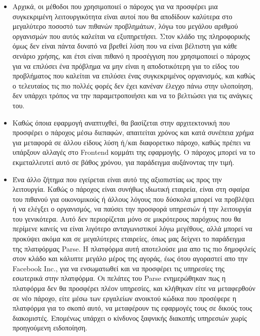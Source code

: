 \documentclass{article}
\begin{document}
\begin{itemize}
\item Αρχικά, οι μέθοδοι που χρησιμοποιεί ο πάροχος για να προσφέρει μια συγκεκριμένη λειτουργικότητα είναι αυτοί που θα αποδίδουν καλύτερα στο μεγαλύτερο ποσοστό των πιθανών προβλημάτων, λόγω του μεγάλου αριθμού οργανισμών που αυτός καλείται να εξυπηρετήσει. Στον κλάδο της πληροφορικής όμως δεν είναι πάντα δυνατό να βρεθεί λύση που να είναι βέλτιστη για κάθε σενάριο χρήσης, και έτσι είναι πιθανό η προσέγγιση που χρησιμοποιεί ο πάροχος για να επιλύσει ένα πρόβλημα να μην είναι η αποδοτικότερη για το είδος του προβλήματος που καλείται να επιλύσει ένας συγκεκριμένος οργανισμός, και καθώς ο τελευταίος τις πιο πολλές φορές δεν έχει κανέναν έλεγχο πάνω στην υλοποίηση, δεν υπάρχει τρόπος να την παραμετροποιήσει  και να το βελτιώσει για τις ανάγκες του.
\item Καθώς όποια εφαρμογή αναπτυχθεί, θα βασίζεται στην αρχιτεκτονική που προσφέρει ο πάροχος μέσω διεπαφών, απαιτείται χρόνος και κατά συνέπεια χρήμα για μεταφορά σε άλλου είδους λύση ή/και διαφορετικο πάροχο, καθώς πρέπει να υπάρξουν αλλαγές στο Frontend κομμάτι της εφαρμογής. Ο πάροχος μπορεί να το εκμεταλλευτεί αυτό σε βάθος χρόνου, για παράδειγμα αυξάνοντας την τιμή.
\item Ένα άλλο ζήτημα που εγείρεται είναι αυτό της αξιοπιστίας ως προς την λειτουργία. Καθώς ο πάροχος είναι συνήθως ιδιωτική εταιρεία, είναι στη σφαίρα του πιθανού για οικονομικούς ή άλλους λόγους που δύσκολα μπορεί να προβλέψει ή να ελέγξει ο οργανισμός, να παύσει την προσφορά υπηρεσιών ή την λειτουργία του γενικότερα. Αυτό δεν περιορίζεται μόνο σε μικρότερους παρόχους που θα περίμενε κανείς να είναι λιγότερο ανταγωνιστικοί λόγω μεγέθους, αλλά μπορεί να προκύψει ακόμα και σε μεγαλύτερες εταιρείες, όπως μας δείχνει το παράδειγμα της πλατφόρμας Parse. Η πλατφόρμα αυτή αποτελούσε μια απο τις πιο δημοφιλείς στον κλάδο και κάλυπτε μεγάλο μέρος της αγοράς, έως ότου αγοραστεί απο την Facebook Inc., για να ενσωματωθεί και να προσφέρει τις υπηρεσίες της εσωτερικά στην πλατφόρμα. Οι πελάτες του Parse ενημερώθηκαν πως η πλατφόρμα δεν θα προσφέρει πλέον υπηρεσίες, και κλήθηκαν είτε να μεταφερθούν σε νέο πάροχο, είτε μέσω των εργαλείων ανοικτού κώδικα που προσέφερε η πλατφόρμα για το σκοπό αυτό, να μεταφέρουν τις εφαρμογές τους σε δικούς τους διακομιστές. Επομένως υπάρχει ο κίνδυνος ξαφνικής διακοπής υπηρεσιών χωρίς προηγούμενη ειδοποίηση.

\end{itemize}
\end{document}
